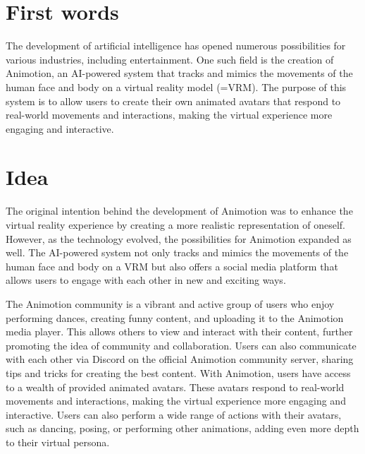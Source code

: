 \section{First words}
The development of artificial intelligence has opened numerous possibilities for various industries, including entertainment. 
One such field is the creation of Animotion, an AI-powered system that tracks and mimics the movements of the human face and 
body on a virtual reality model (=VRM). The purpose of this system is to allow users to create their own animated avatars that 
respond to real-world movements and interactions, making the virtual experience more engaging and interactive.

\section{Idea}
The original intention behind the development of Animotion was to enhance the virtual reality experience by creating a more realistic representation of oneself. 
However, as the technology evolved, the possibilities for Animotion expanded as well. The AI-powered system not only tracks and mimics the movements of the 
human face and body on a VRM but also offers a social media platform that allows users to engage with each other in new and exciting ways.

The Animotion community is a vibrant and active group of users who enjoy performing dances, creating funny content, and uploading 
it to the Animotion media player. This allows others to view and interact with their content, further promoting the idea of community 
and collaboration. Users can also communicate with each other via Discord on the official Animotion community server, 
sharing tips and tricks for creating the best content. With Animotion, users have access to a wealth of provided animated avatars. These avatars 
respond to real-world movements and interactions, making the virtual experience more engaging and interactive. Users can 
also perform a wide range of actions with their avatars, such as dancing, posing, or performing other animations, 
adding even more depth to their virtual persona.

